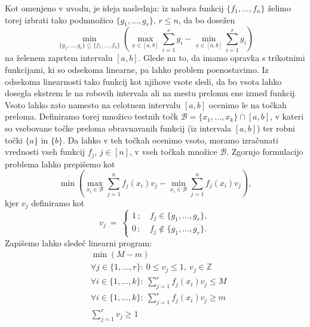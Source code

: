 \documentclass[11pt]{article}
\theoremstyle{definition}
\newcommand{\Z}{\mathbb{Z}}
\newcommand{\1}{\mathbbm{1}}
\newcommand{\set}[1]{\{#1\}}
\newcommand{\B}{\mathcal{B}}
\begin{document}
Kot omenjeno v uvodu, je ideja naslednja: iz nabora funkcij $\set{f_1,\ldots,f_n}$ želimo torej izbrati tako podmnožico $\set{g_1,\ldots,g_r}$, $r \leq n$, da bo dosežen
$$\min_{\set{g_1,\ldots,g_r} \subseteq \set{f_1,\ldots,f_n}}\left({\max_{x \in [a,b]}\sum_{i=1}^r g_i - \min_{x \in [a,b]}\sum_{i=1}^r g_i}\right)$$
na želenem zaprtem intervalu $[a,b]$. Glede na to, da imamo opravka s trikotnimi funkcijami, ki so odsekoma linearne, pa lahko problem poenostavimo. Iz odsekoma linearnosti tako funkcij kot njihove vsote sledi, da bo vsota lahko dosegla ekstrem le na robovih intervala ali na mestu prelomu ene izmed funkcij. Vsoto lahko zato namesto na celotnem intervalu $[a,b]$ ocenimo le na točkah preloma. Definiramo torej množico testnih točk $\mathcal{B} = \set{x_1,\ldots,x_k} \cap [a,b]$, v kateri so vsebovane točke preloma obravnavanih funkcij (iz intervala $[a,b]$) ter robni točki $\set{a}$ in $\set{b}$. Da lahko v teh točkah ocenimo vsoto, moramo izračunati vrednosti vseh funkcij $f_j$, $j \in [n]$, v vseh točkah množice $\B$. Zgornjo formulacijo problema lahko prepišemo kot
$$\min \left( \max_{x_i \in \B} \sum_{j=1}^n f_j(x_i)v_j - \min_{x_i \in \mathcal{B}} \sum_{j=1}^n f_j(x_i)v_j \right),$$
kjer $v_j$ definiramo kot
$$v_j ~=~ \begin{cases}
1\,; ~&f_j \in \set{g_1,\ldots,g_r}, \\
0\,; ~&f_j \notin \set{g_1,\ldots,g_r}.
\end{cases}$$
Zapišemo lahko sledeč linearni program:
\begin{align*}
&\min(M-m) \\
&\forall j \in \set{1,\ldots,r}: ~0 \leq v_j \leq 1, ~v_j \in \Z \\
&\forall i \in \set{1,\ldots,k}: ~\sum_{j=1}^r f_j(x_i)v_j \leq M \\
&\forall i \in \set{1,\ldots,k}: ~\sum_{j=1}^r f_j(x_i)v_j \geq m \\
&\sum_{j=1}^r v_j \geq 1
\end{align*}

\end{document}
